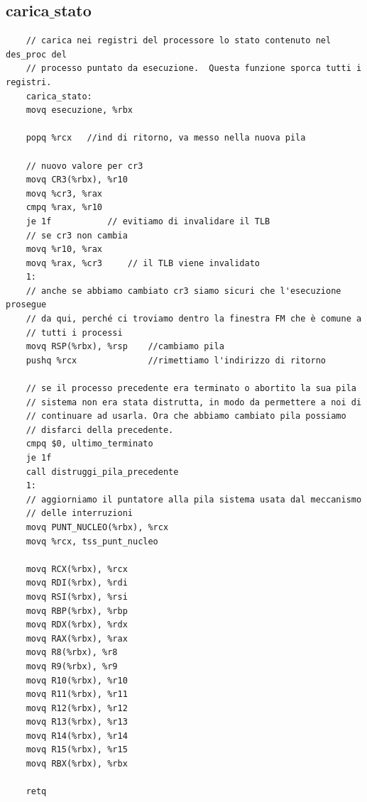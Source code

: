 \subsection{carica$\_$stato}
\small 
\begin{verbatim}
	// carica nei registri del processore lo stato contenuto nel des_proc del
	// processo puntato da esecuzione.  Questa funzione sporca tutti i registri.
	carica_stato:
	movq esecuzione, %rbx
	
	popq %rcx   //ind di ritorno, va messo nella nuova pila
	
	// nuovo valore per cr3
	movq CR3(%rbx), %r10
	movq %cr3, %rax
	cmpq %rax, %r10
	je 1f			// evitiamo di invalidare il TLB
	// se cr3 non cambia
	movq %r10, %rax
	movq %rax, %cr3		// il TLB viene invalidato
	1:
	// anche se abbiamo cambiato cr3 siamo sicuri che l'esecuzione prosegue
	// da qui, perché ci troviamo dentro la finestra FM che è comune a
	// tutti i processi
	movq RSP(%rbx), %rsp    //cambiamo pila
	pushq %rcx              //rimettiamo l'indirizzo di ritorno
	
	// se il processo precedente era terminato o abortito la sua pila
	// sistema non era stata distrutta, in modo da permettere a noi di
	// continuare ad usarla. Ora che abbiamo cambiato pila possiamo
	// disfarci della precedente.
	cmpq $0, ultimo_terminato
	je 1f
	call distruggi_pila_precedente
	1:
	// aggiorniamo il puntatore alla pila sistema usata dal meccanismo
	// delle interruzioni
	movq PUNT_NUCLEO(%rbx), %rcx
	movq %rcx, tss_punt_nucleo
	
	movq RCX(%rbx), %rcx
	movq RDI(%rbx), %rdi
	movq RSI(%rbx), %rsi
	movq RBP(%rbx), %rbp
	movq RDX(%rbx), %rdx
	movq RAX(%rbx), %rax
	movq R8(%rbx), %r8
	movq R9(%rbx), %r9
	movq R10(%rbx), %r10
	movq R11(%rbx), %r11
	movq R12(%rbx), %r12
	movq R13(%rbx), %r13
	movq R14(%rbx), %r14
	movq R15(%rbx), %r15
	movq RBX(%rbx), %rbx
	
	retq
\end{verbatim}
\normalsize 
